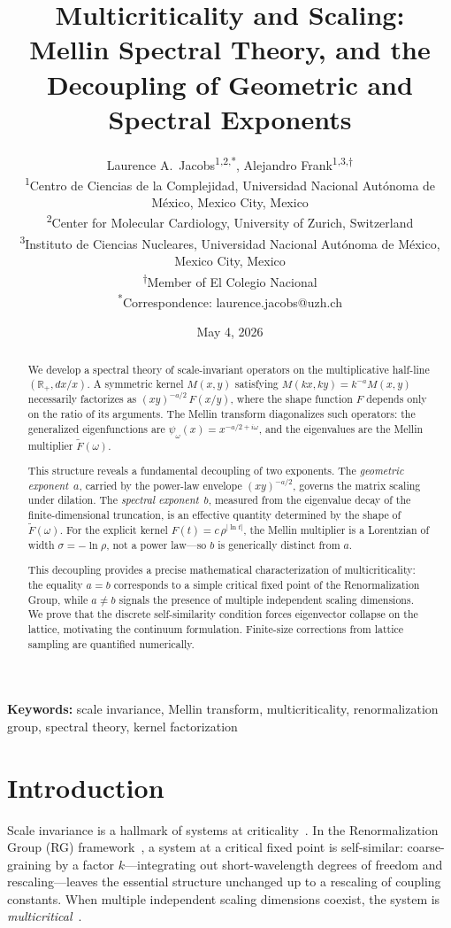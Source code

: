 \documentclass[12pt]{article}
\title{Multicriticality and Scaling:\\ Mellin Spectral Theory, and the\\
Decoupling of Geometric and Spectral Exponents}
\author{
Laurence A.\ Jacobs\textsuperscript{1,2,*},\quad
Alejandro Frank\textsuperscript{1,3,$\dagger$} \\[6pt]
{\small \textsuperscript{1}Centro de Ciencias de la Complejidad,
Universidad Nacional Aut\'onoma de M\'exico, Mexico City, Mexico} \\[3pt]
{\small \textsuperscript{2}Center for Molecular Cardiology, University of Zurich, Switzerland} \\[3pt]
{\small \textsuperscript{3}Instituto de Ciencias Nucleares,
  Universidad Nacional Aut\'onoma de M\'exico,
  Mexico City, Mexico}\\[3pt]
{\small \textsuperscript{$\dagger$}Member of El Colegio Nacional} \\[6pt]
{\small \textsuperscript{*}Correspondence: laurence.jacobs@uzh.ch}
}
\date{May 4, 2026}
\begin{document}
\maketitle

\begin{abstract}
We develop a spectral theory of scale-invariant operators on the multiplicative half-line $(\mathbb{R}_+, dx/x)$. A symmetric kernel $M(x,y)$ satisfying $M(kx,ky) = k^{-a} M(x,y)$ necessarily factorizes as $(xy)^{-a/2}\, F(x/y)$, where the shape function $F$ depends only on the ratio of its arguments. The Mellin transform diagonalizes such operators: the generalized eigenfunctions are $\psi_\omega(x) = x^{-a/2 + i\omega}$, and the eigenvalues are the Mellin multiplier $\widetilde{F}(\omega)$.

This structure reveals a fundamental decoupling of two exponents. The \emph{geometric exponent}~$a$, carried by the power-law envelope $(xy)^{-a/2}$, governs the matrix scaling under dilation. The \emph{spectral exponent}~$b$, measured from the eigenvalue decay of the finite-dimensional truncation, is an effective quantity determined by the shape of $\widetilde{F}(\omega)$. For the explicit kernel $F(t) = c\,\rho^{|\ln t|}$, the Mellin multiplier is a Lorentzian of width $\sigma = -\ln\rho$, not a power law---so $b$ is generically distinct from $a$.

This decoupling provides a precise mathematical characterization of multicriticality: the equality $a = b$ corresponds to a simple critical fixed point of the Renormalization Group, while $a \neq b$ signals the presence of multiple independent scaling dimensions. We prove that the discrete self-similarity condition forces eigenvector collapse on the lattice, motivating the continuum formulation. Finite-size corrections from lattice sampling are quantified numerically.
\end{abstract}

\medskip
\noindent\textbf{Keywords:} scale invariance, Mellin transform, multicriticality, renormalization group, spectral theory, kernel factorization

\section{Introduction}

Scale invariance is a hallmark of systems at criticality~\cite{Stanley1971,Fisher1998,Goldenfeld1992}. In the Renormalization Group (RG) framework~\cite{Wilson1971,Kadanoff1966,WilsonKogut1974}, a system at a critical fixed point is self-similar: coarse-graining by a factor $k$---integrating out short-wavelength degrees of freedom and rescaling---leaves the essential structure unchanged up to a rescaling of coupling constants. When multiple independent scaling dimensions coexist, the system is \emph{multicritical}~\cite{Wegner1972,ZinnJustin2002}.
\end{document}
